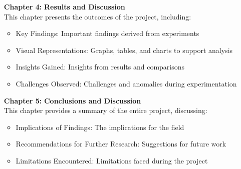 \begin{itemize}[leftmargin=2.15cm, labelwidth=1.5cm]
    \item[\textbf{Chapter 4:}] \textbf{Results and Discussion}\\
    This chapter presents the outcomes of the project, including:
    \begin{itemize}
        \item Key Findings: Important findings derived from experiments
        \item Visual Representations: Graphs, tables, and charts to support analysis
        \item Insights Gained: Insights from results and comparisons
        \item Challenges Observed: Challenges and anomalies during experimentation
    \end{itemize}

    \item[\textbf{Chapter 5:}] \textbf{Conclusions and Discussion}\\
    This chapter provides a summary of the entire project, discussing:
    \begin{itemize}
        \item Implications of Findings: The implications for the field
        \item Recommendations for Further Research: Suggestions for future work
        \item Limitations Encountered: Limitations faced during the project
    \end{itemize}
\end{itemize}
